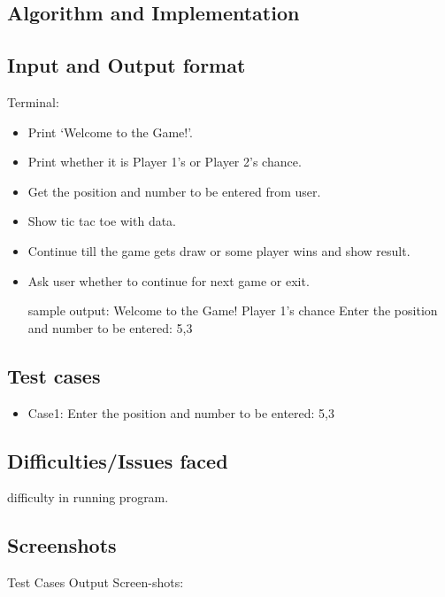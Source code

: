 \documentclass[12pt]{article}
\begin{document}



\subsection{Algorithm and Implementation}



\subsection{Input and Output format}
Terminal:
\begin{itemize}
\item Print ‘Welcome to the Game!’.	
\item Print whether it is Player 1’s or Player 2’s chance.
\item Get the position and number to be entered from user.
\item Show 	tic tac toe with data.
\item Continue till the game gets draw or some player wins and show result.
\item Ask user whether to continue for next game or exit.

sample output: 
Welcome to the Game!
Player 1’s chance
Enter the position and number to be entered: 5,3

\end{itemize}

\subsection{Test cases}
\begin{itemize}


\item Case1:
Enter the position and number to be entered: 5,3



\end{itemize}


\subsection{Difficulties/Issues faced}
difficulty in running program.
\subsection{Screenshots}
Test Cases Output Screen-shots:
\end{document}

